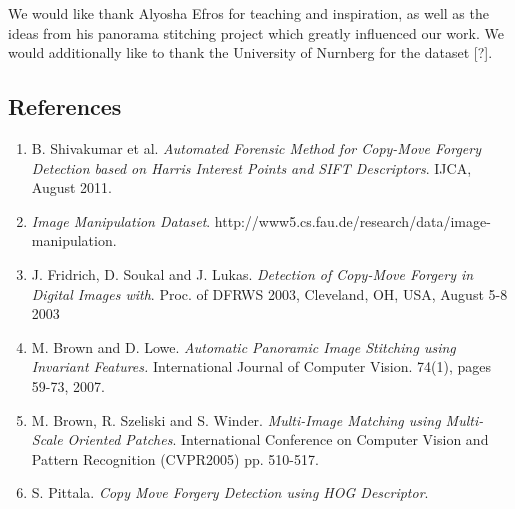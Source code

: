 \documentclass[12pt]{article}
\begin{document}
We would like thank Alyosha Efros for teaching and inspiration, as well as the ideas from his panorama stitching project which greatly influenced our work. We would additionally like to thank the University of Nurnberg for the dataset [?].

\subsection*{References}

\begin{enumerate}
\item B. Shivakumar et al. {\it Automated Forensic Method for Copy-Move Forgery Detection based on Harris Interest Points and SIFT Descriptors}. IJCA, August 2011. 
\item {\it Image Manipulation Dataset}. http://www5.cs.fau.de/research/data/image-manipulation. 
\item J. Fridrich, D. Soukal and J. Lukas. {\it Detection of Copy-Move Forgery in Digital Images with}. Proc. of DFRWS 2003, Cleveland, OH, USA, August 5-8 2003
\item M. Brown and D. Lowe. {\it Automatic Panoramic Image Stitching using Invariant Features.} International Journal of Computer Vision. 74(1), pages 59-73, 2007.
\item M. Brown, R. Szeliski and S. Winder. {\it Multi-Image Matching using Multi-Scale Oriented Patches}. International Conference on Computer Vision and Pattern Recognition (CVPR2005) pp. 510-517.
\item S. Pittala. {\it Copy Move Forgery Detection using HOG Descriptor}.
\end{enumerate}
\end{document}
